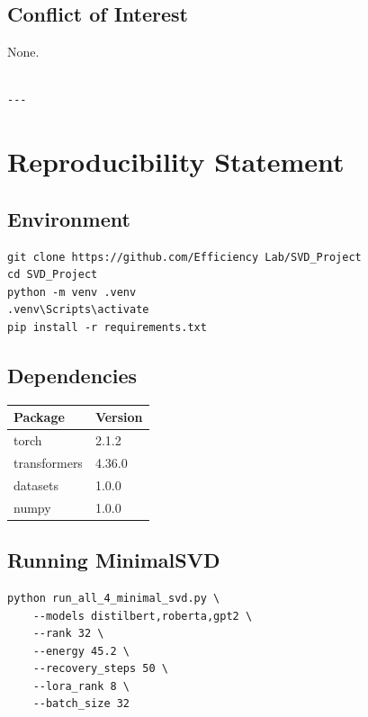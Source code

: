 \subsection{Conflict of Interest}

None.
\begin{lstlisting}

---
\end{lstlisting}


\section{Reproducibility Statement}

\subsection{Environment}

\begin{lstlisting}
git clone https://github.com/Efficiency Lab/SVD_Project
cd SVD_Project
python -m venv .venv
.venv\Scripts\activate
pip install -r requirements.txt
\end{lstlisting}

\subsection{Dependencies}

\begin{table}[H]
\centering
\small
\begin{tabular}{ll}
\toprule
\textbf{Package} & \textbf{Version} \\
\midrule
torch & 2.1.2 \\
transformers & 4.36.0 \\
datasets & 1.0.0 \\
numpy & 1.0.0 \\
\bottomrule
\end{tabular}
\end{table}

\subsection{Running MinimalSVD}

\begin{lstlisting}
python run_all_4_minimal_svd.py \
    --models distilbert,roberta,gpt2 \
    --rank 32 \
    --energy 45.2 \
    --recovery_steps 50 \
    --lora_rank 8 \
    --batch_size 32
\end{lstlisting}


